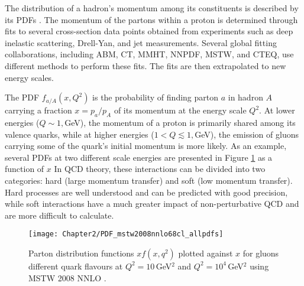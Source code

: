
The distribution of a hadron's momentum among its constituents is described by its
PDFs \cite{Butterworth:2015oua}. The momentum of the partons within a proton is 
determined through fits to several cross-section data points obtained from experiments 
such as deep inelastic scattering, Drell-Yan, and jet measurements. Several global fitting 
collaborations, including ABM, CT, MMHT, NNPDF, MSTW, and CTEQ, use different 
methods to perform these fits. The fits are then extrapolated to new energy scales.

The PDF $f_{a/A}(x, Q^{2})$ is the probability of finding parton $a$ in hadron $A$ 
carrying a fraction $x=p_{a}/p_{A}$ of its momentum at the energy scale $Q^2$. 
At lower energies ($Q\sim1,$GeV), the momentum of a proton is primarily shared 
among its valence quarks, while at higher energies ($1 <Q \lesssim 1,$GeV), 
the emission of gluons carrying some of the quark's initial momentum is more likely.
As an example, several PDFs at two different scale energies  are presented in Figure \ref{fig:Chap2:NNLO_PDF} as a function of $x$
In QCD theory, these interactions can be divided into two categories: 
hard (large momentum transfer) and soft (low momentum transfer). 
Hard processes are well understood and can be predicted with good precision,
while soft interactions have a much greater impact of non-perturbative QCD and are more difficult to calculate.

\begin{figure}
 	  \centering
	\texttt{[image: Chapter2/PDF\_mstw2008nnlo68cl\_allpdfs]}
	\caption{Parton distribution functions $xf(x,q^{2})$ plotted against $x$ for gluons different quark flavours 
		      at $Q^{2}=10\,$GeV$^2$ and $Q^{2}=10^{4}\,$GeV$^2$ using MSTW 2008 NNLO
		      \cite{Martin:2009iq}.}
	\label{fig:Chap2:NNLO_PDF}
\end{figure} 


